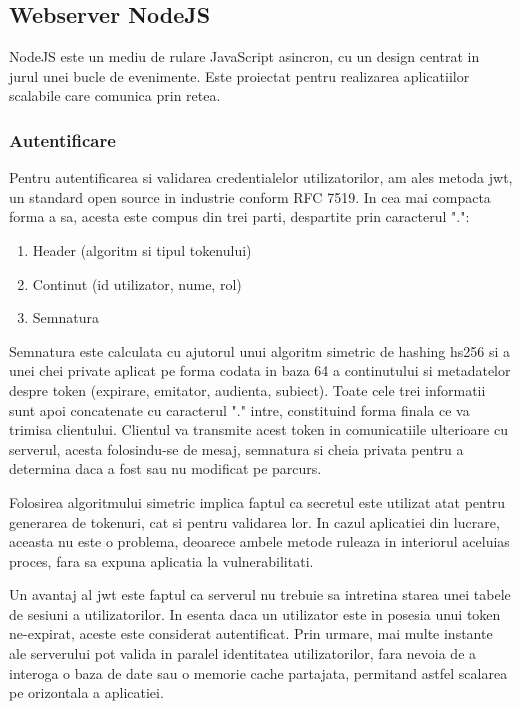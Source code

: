 \subsection {Webserver NodeJS}

NodeJS este un mediu de rulare JavaScript asincron, cu un design centrat in jurul unei bucle de evenimente. Este proiectat pentru realizarea aplicatiilor scalabile care comunica prin retea. \cite{NodeJs2021}

\subsubsection {Autentificare}

Pentru autentificarea si validarea credentialelor utilizatorilor, am ales metoda \acrfull{jwt}, un standard open source in industrie conform RFC 7519. In cea mai compacta forma a sa, acesta este compus din trei parti, despartite prin caracterul ".":

\begin{enumerate}
  \item Header (algoritm si tipul tokenului)
  \item Continut (id utilizator, nume, rol)
  \item Semnatura
\end{enumerate}

Semnatura este calculata cu ajutorul unui algoritm simetric de hashing \acrfull{hs256} si a unei chei private aplicat pe forma codata in baza 64 a continutului si metadatelor despre token (expirare, emitator, audienta, subiect). Toate cele trei informatii sunt apoi concatenate cu caracterul "." intre, constituind forma finala ce va trimisa clientului. Clientul va transmite acest token in comunicatiile ulterioare cu serverul, acesta folosindu-se de mesaj, semnatura si cheia privata pentru a determina daca a fost sau nu modificat pe parcurs.

Folosirea algoritmului simetric implica faptul ca secretul este utilizat atat pentru generarea de tokenuri, cat si pentru validarea lor. In cazul aplicatiei din lucrare, aceasta nu este o problema, deoarece ambele metode ruleaza in interiorul aceluias proces, fara sa expuna aplicatia la vulnerabilitati.

Un avantaj al \acrshort{jwt} este faptul ca serverul nu trebuie sa intretina starea unei tabele de sesiuni a utilizatorilor. In esenta daca un utilizator este in posesia unui token ne-expirat, aceste este considerat autentificat. Prin urmare, mai multe instante ale serverului pot valida in paralel identitatea utilizatorilor, fara nevoia de a interoga o baza de date sau o memorie cache partajata, permitand astfel scalarea pe orizontala a aplicatiei.


